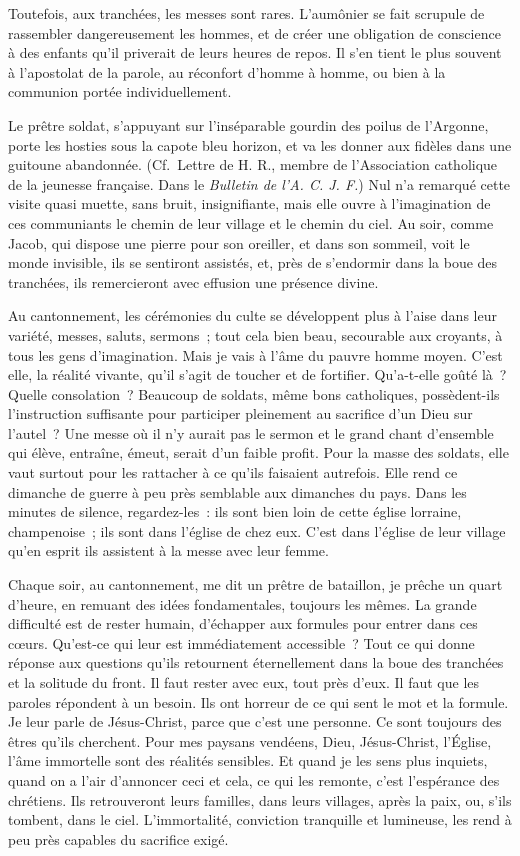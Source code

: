 \documentclass[french,twoside]{book} %
\begin{document}
Toutefois, aux tranchées, les messes sont rares. L’aumônier se fait scrupule de rassembler dangereusement les hommes, et de créer une obligation de conscience à des enfants qu’il priverait de leurs heures de repos. Il s’en tient le plus souvent à l’apostolat de la parole, au réconfort d’homme à homme, ou bien à la communion portée individuellement.‌\par
Le prêtre soldat, s’appuyant sur l’inséparable gourdin des poilus de l’Argonne, porte les hosties sous la capote bleu horizon, et va les donner aux fidèles dans une guitoune abandonnée. (Cf. Lettre de H. R., membre de l’Association catholique de la jeunesse française. Dans le {\itshape Bulletin de l’A. C. J. F.}) Nul n’a remarqué cette visite quasi muette, sans bruit, insignifiante, mais elle ouvre à l’imagination de ces communiants le chemin de leur village et le chemin du ciel. Au soir, comme Jacob, qui dispose une pierre pour son oreiller, et dans son sommeil, voit le monde invisible, ils se sentiront assistés, et, près de s’endormir dans la boue des tranchées, ils remercieront avec effusion une présence divine.‌\par
Au cantonnement, les cérémonies du culte se développent plus à l’aise dans leur variété, messes, saluts, sermons ; tout cela bien beau, secourable aux croyants, à tous les gens d’imagination. Mais je vais à l’âme du pauvre homme moyen. C’est elle, la réalité vivante, qu’il s’agit de toucher et de fortifier. Qu’a-t-elle goûté là ? Quelle consolation ? Beaucoup de soldats, même bons catholiques, possèdent-ils l’instruction suffisante pour participer pleinement au sacrifice d’un Dieu sur l’autel ? Une messe où il n’y aurait pas le sermon et le grand chant d’ensemble qui élève, entraîne, émeut, serait d’un faible profit. Pour la masse des soldats, elle vaut surtout pour les rattacher à ce qu’ils faisaient autrefois. Elle rend ce dimanche de guerre à peu près semblable aux dimanches du pays. Dans les minutes de silence, regardez-les : ils sont bien loin de cette église lorraine, champenoise ; ils sont dans l’église de chez eux. C’est dans l’église de leur village qu’en esprit ils assistent à la messe avec leur femme.‌\par
Chaque soir, au cantonnement, me dit un prêtre de bataillon, je prêche un quart d’heure, en remuant des idées fondamentales, toujours les mêmes. La grande difficulté est de rester humain, d’échapper aux formules pour entrer dans ces cœurs. Qu’est-ce qui leur est immédiatement accessible ? Tout ce qui donne réponse aux questions qu’ils retournent éternellement dans la boue des tranchées et la solitude du front. Il faut rester avec eux, tout près d’eux. Il faut que les paroles répondent à un besoin. Ils ont horreur de ce qui sent le mot et la formule. Je leur parle de Jésus-Christ, parce que c’est une personne. Ce sont toujours des êtres qu’ils cherchent. Pour mes paysans vendéens, Dieu, Jésus-Christ, l’Église, l’âme immortelle sont des réalités sensibles. Et quand je les sens plus inquiets, quand on a l’air d’annoncer ceci et cela, ce qui les remonte, c’est l’espérance des chrétiens. Ils retrouveront leurs familles, dans leurs villages, après la paix, ou, s’ils tombent, dans le ciel. L’immortalité, conviction tranquille et lumineuse, les rend à peu près capables du sacrifice exigé.‌\par
\end{document}
